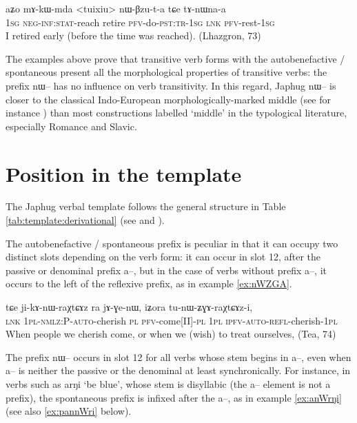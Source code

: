 \documentclass[oldfontcommands,oneside,a4paper,11pt]{article}
\newcommand{\ipa}[1]{{\phon \mbox{#1}}} %
\begin{document}
 \begin{exe}
\ex \label{ex:tuixiu.nWBzuta}
\gll 
\ipa{aʑo} 	\ipa{mɤ-kɯ-mda} 	<tuixiu> 	\ipa{nɯ-βzu-t-a} \ipa{tɕe} 	\ipa{tɤ-nɯna-a} \\
\textsc{1sg} \textsc{neg-inf:stat}-reach retire \textsc{pfv}-do-\textsc{pst:tr-1sg} \textsc{lnk} \textsc{pfv}-rest-\textsc{1sg} \\
\glt I retired early (before the time was reached). (Lhazgron, 73)
\end{exe} 

The examples above prove that transitive verb forms with the autobenefactive / spontaneous present all the morphological  properties of transitive verbs: the prefix \ipa{nɯ--} has no influence on verb transitivity. In this regard, Japhug \ipa{nɯ--} is closer to the classical Indo-European morphologically-marked middle (see for instance  \citealt[19]{pooth14diathesen}) than most constructions labelled `middle' in the typological literature, especially Romance and Slavic.

\section{Position in the template}
The Japhug verbal template follows the general structure in Table \ref{tab:template:derivational} (see \citealt{jacques12incorp} and \citealt{jacques13harmonization}). 

The autobenefactive / spontaneous prefix is peculiar in that it can occupy two distinct slots depending on the verb form: it can occur  in slot 12, after the passive or denominal prefix \ipa{a--}, but in the case of verbs without prefix \ipa{a--}, it occurs to the left of the reflexive prefix, as in example \ref{ex:nWZGA}.

\begin{exe}
\ex \label{ex:nWZGA}
\gll 
\ipa{tɕe}  	\ipa{ji-kɤ-nɯ-raχtɕɤz}  	\ipa{ra}  	\ipa{jɤ-ɣe-nɯ,}  	\ipa{iʑora}  	\ipa{tu-nɯ-ʑɣɤ-raχtɕɤz-i,}  \\
\textsc{lnk} \textsc{1pl-nmlz:P-auto}-cherish \textsc{pl} \textsc{pfv}-come[II]-\textsc{pl} \textsc{1pl} \textsc{ipfv-auto-refl}-cherish-\textsc{1pl} \\
\glt When people we cherish come, or when we (wish) to treat ourselves, (Tea, 74)
\end{exe}

The prefix \ipa{nɯ--} occurs in slot 12 for all verbs whose stem begins in \ipa{a--}, even when   \ipa{a--} is neither the passive or the denominal at least synchronically. For instance, in verbs such as \ipa{arŋi} `be blue', whose stem is disyllabic (the \ipa{a--} element is not a prefix), the spontaneous prefix is infixed after the \ipa{a--}, as in  example \ref{ex:anWrŋi} (see also \ref{ex:pannWri} below).
\end{document}
